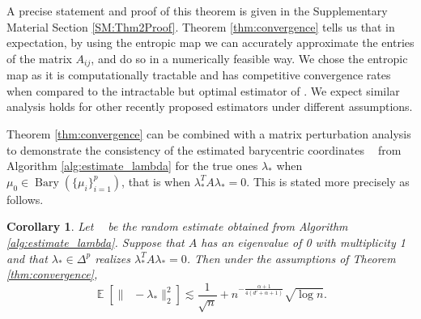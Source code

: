 \documentclass[nohyperref]{article}
\DeclareMathOperator*{\bary}{Bary}
\DeclareMathOperator*{\E}{\mathbb{E}}
\DeclareMathOperator*{\hatlambda}{\hat{\lambda}}
\newtheorem{corollary}{Corollary}
\theoremstyle{definition}
\begin{document}
A precise statement and proof of this theorem is given in the Supplementary Material Section \ref{SM:Thm2Proof}. Theorem \ref{thm:convergence} tells us that in expectation, by using the entropic map we can accurately approximate the entries of the matrix $A_{ij}$, and do so in a numerically feasible way. We chose the entropic map as it is computationally tractable and has competitive convergence rates when compared to the intractable but optimal estimator of \cite{hutter2021minimax}.  We expect similar analysis holds for other recently proposed estimators \cite{deb2021rates, gunsilius_2021, manole2021plugin, muzellec2021near} under different assumptions.

Theorem \ref{thm:convergence} can be combined with a matrix perturbation analysis to demonstrate the consistency of the estimated barycentric coordinates $\hatlambda$ from Algorithm \ref{alg:estimate_lambda} for the true ones $\lambda_{*}$ when $\mu_{0}\in \bary(\{\mu_{i}\}_{i=1}^{p})$, that is when $\lambda_{*}^{T}A\lambda_{*}=0$. This is stated more precisely as follows. 

\begin{corollary}\label{cor:consistency} Let $\hatlambda$ be the random estimate obtained from Algorithm \ref{alg:estimate_lambda}.  Suppose that $A$ has an eigenvalue of 0 with multiplicity 1 and that $\lambda_{*}\in\Delta^{p}$ realizes $\lambda_{*}^{T}A\lambda_{*}=0$.  Then under the assumptions of Theorem \ref{thm:convergence}, \[\E[\|\hatlambda -\lambda_{*}\|_{2}^{2}]\lesssim \frac{1}{\sqrt{n}} + n^{-\frac{\alpha + 1}{4(d' + \alpha + 1)}}\sqrt{\log n}.\]

\end{corollary}
\end{document}
